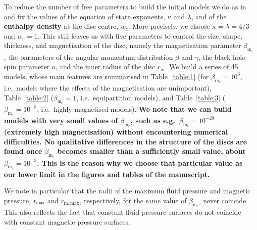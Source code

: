 \documentclass{aa}
\begin{document}
To reduce the number of free parameters to build the initial models we do as in~\citet{Komissarov:2006} and fix the values of the equation of state exponents, $\kappa$ and $\lambda$, and of the {\bf enthalpy density} at the disc centre, $w_{\mathrm{c}}$. More precisely, we choose $\kappa = \lambda = 4/3$ and $w_{\mathrm{c}} = 1$. This still leaves us with five parameters to control the size, shape, thickness, and magnetisation of the disc, namely the magnetisation parameter $\beta_{\mathrm{m}_{\mathrm{c}}}$, the parameters of the angular momentum distribution $\beta$ and $\gamma$, the black hole spin parameter $a$, and the inner radius of the disc $r_{\mathrm{in}}$. We build a series of 45 models, whose main features are summarised in Table~\ref{table:1} (for $\beta_{\mathrm{m}_{\mathrm{c}}} = 10^{3}$, i.e.~models where the effects of the magnetisation are unimportant), Table~\ref{table:2} ($\beta_{\mathrm{m}_{\mathrm{c}}} = 1$, i.e.~equipartition models), and Table~\ref{table:3} ($\beta_{\mathrm{m}_{\mathrm{c}}} = 10^{-3}$, i.e.~highly-magnetised models). {\bf We note that we can build models with very small values of $\beta_{\mathrm{m}_{\mathrm{c}}}$, such as  e.g.~$\beta_{\mathrm{m}_{\mathrm{c}}} = 10^{-20}$ (extremely high magnetisation) without encountering numerical difficulties. No qualitative differences in the structure of the discs are found once $\beta_{\mathrm{m}_{\mathrm{c}}}$ becomes smaller than a sufficiently small value, about $\beta_{\mathrm{m}_{\mathrm{c}}}=10^{-3}$. This is the reason why we choose that particular value as our lower limit in the figures and tables of the manuscript.}

We note in particular that the radii of the maximum fluid pressure and magnetic pressure, $r_{{\rm{max}}}$ and $r_{{\mathrm{m, max}}}$, respectively, for the same value of $\beta_{\mathrm{m}_{\mathrm{c}}}$, never coincide. This also reflects the fact that constant fluid pressure surfaces do not coincide with constant magnetic pressure surfaces.
\end{document}
